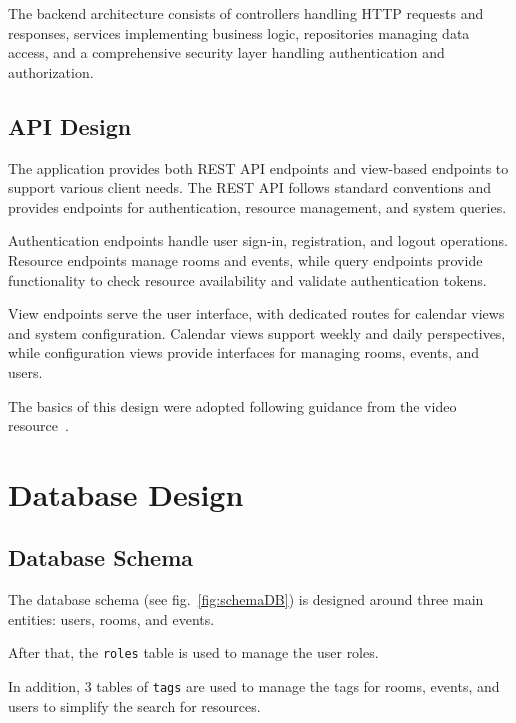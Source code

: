 The backend architecture consists of controllers handling HTTP requests and responses, services implementing business logic, repositories managing data access, and a comprehensive security layer handling authentication and authorization.

\subsection{API Design}\label{subsec:api-design}

The application provides both REST API endpoints and view-based endpoints to support various client needs.
The REST API follows standard conventions and provides endpoints for authentication, resource management, and system queries.

Authentication endpoints handle user sign-in, registration, and logout operations.
Resource endpoints manage rooms and events, while query endpoints provide functionality to check resource availability and validate authentication tokens.

View endpoints serve the user interface, with dedicated routes for calendar views and system configuration.
Calendar views support weekly and daily perspectives, while configuration views provide interfaces for managing rooms, events, and users.

The basics of this design were adopted following guidance from the video resource~\cite{VisualComputerScience2023}.


\section{Database Design}\label{sec:database-design}

\subsection{Database Schema}\label{subsec:database-schema}
The database schema (see fig.~\ref{fig:schemaDB}) is designed around three main entities: users, rooms, and events.

After that, the \texttt{roles} table is used to manage the user roles.

In addition, 3 tables of \texttt{tags} are used to manage the tags for rooms, events, and users to simplify the search for resources.

